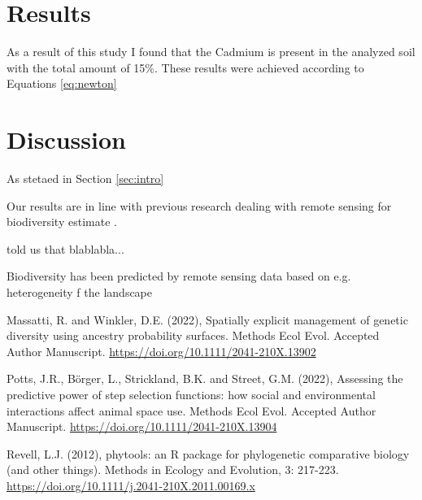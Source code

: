 \documentclass[a4paper, 12pt]{article} %
\begin{document}
\section{Results}
As a result of this study I found that the Cadmium is present in the analyzed soil with the total amount of 15\%. These results were achieved according to Equations \ref{eq:newton} %

\section{Discussion}
As stetaed in Section \ref{sec:intro}

Our results are in line with previous research dealing with remote sensing for biodiversity estimate \citep{Revell_2012, Potts_2022}. %

\citet{Revell_2012} told us that blablabla... %

Biodiversity has been predicted by remote sensing data based on e.g. heterogeneity f the landscape \citep{Massatti_2022}

\begin{thebibliography}{999} %

Massatti, R. and Winkler, D.E. (2022), Spatially explicit management of genetic diversity using ancestry probability surfaces. Methods Ecol Evol. Accepted Author Manuscript. \url{https://doi.org/10.1111/2041-210X.13902} %

Potts, J.R., Börger, L., Strickland, B.K. and Street, G.M. (2022), Assessing the predictive power of step selection functions: how social and environmental interactions affect animal space use. Methods Ecol Evol. Accepted Author Manuscript. \url{https://doi.org/10.1111/2041-210X.13904}

Revell, L.J. (2012), phytools: an R package for phylogenetic comparative biology (and other things). Methods in Ecology and Evolution, 3: 217-223. \url{https://doi.org/10.1111/j.2041-210X.2011.00169.x}

\end{thebibliography}
\end{document}
